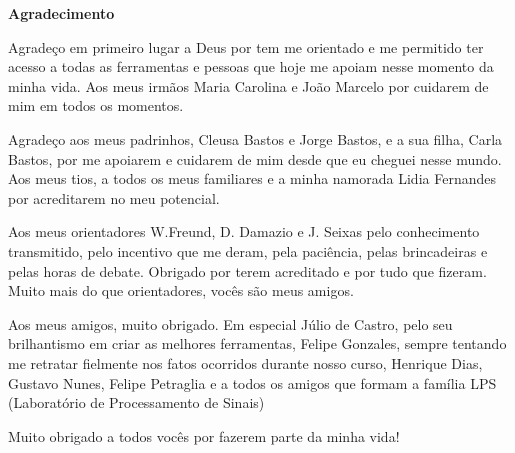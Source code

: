 \cleardoublepage

\begin{center}
\textbf{\Large Agradecimento}
\end{center}

Agradeço em primeiro lugar a Deus por tem me orientado e me permitido
ter acesso a todas as ferramentas e pessoas que hoje me apoiam nesse 
momento da minha vida. Aos meus irmãos Maria Carolina e João Marcelo
por cuidarem de mim em todos os momentos.

Agradeço aos meus padrinhos, Cleusa Bastos e Jorge Bastos, e a sua filha,
Carla Bastos, por me apoiarem e cuidarem de mim desde que eu cheguei nesse
mundo. Aos meus tios, a todos os meus familiares e a minha namorada Lidia
Fernandes por acreditarem no meu potencial.

Aos meus orientadores W.Freund, D. Damazio e J. Seixas pelo conhecimento
transmitido, pelo incentivo que me deram, pela paciência, pelas brincadeiras e 
pelas horas de debate. Obrigado por terem acreditado e por tudo que fizeram. 
Muito mais do que orientadores, vocês são meus amigos.

Aos meus amigos, muito obrigado. Em especial Júlio de Castro, pelo seu 
brilhantismo em criar as melhores ferramentas, Felipe Gonzales, sempre tentando 
me retratar fielmente nos fatos ocorridos durante nosso curso, Henrique Dias, 
Gustavo Nunes, Felipe Petraglia e a todos os amigos que formam a família 
LPS (Laboratório de Processamento de Sinais)

Muito obrigado a todos vocês por fazerem parte da minha vida!
